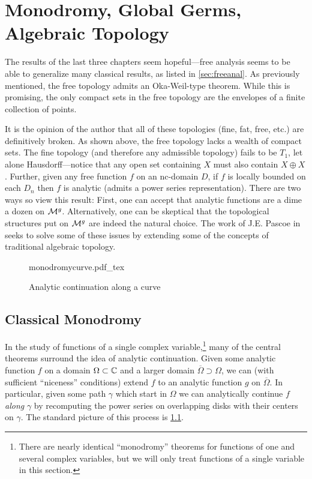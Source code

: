 \chapter{Monodromy, Global Germs, Algebraic Topology}\label{ch:monodromy}

The results of the last three chapters seem hopeful---free analysis seems to be
able to generalize many classical results, as listed in \cref{sec:freeanal}. As
previously mentioned, the free topology admits an Oka-Weil-type theorem.
While this is promising, the only compact sets in the free topology are the
envelopes of a finite collection of points.

It is the opinion of the author that all of these topologies (fine, fat, free,
etc.) are definitively
broken. As shown above, the free topology lacks a wealth of compact sets.
The fine topology (and therefore any admissible topology)
fails to be \(T_1\), let alone Hausdorff---notice that any open set containing
\(X\) must also contain \(X\oplus X\). Further, given any free function \(f\)
on an nc-domain \(D\), if \(f\) is locally bounded on each \(D_n\) then \(f\)
is analytic (admits a power series representation). There are two ways so view
this result: First, one can accept that analytic functions are a dime a dozen on
\(\mathcal{M}^{g} \). Alternatively, one can be skeptical that the topological
structures put on \(\mathcal{M}^{g} \) are indeed the natural choice. The work of J.E.
Pascoe in \cite{pascoeFreeNoncommutativePrincipal2020} seeks to solve some of
these issues by extending some of the concepts of traditional algebraic
topology.
\begin{figure}[h!]%
\centering
  \def\svgwidth{0.8\columnwidth}
  {monodromycurve.pdf_tex}
\caption{Analytic continuation along a curve}
\label{fig:monocurve}
\end{figure}

\newpage

\section{Classical Monodromy}%
\label{sec:classmono}

In the study of functions of a single complex variable,\footnote{There are nearly
  identical ``monodromy'' theorems for functions of one and several complex
  variables, but we will only treat functions of a single variable in this section.}
many of the central
theorems surround the idea of analytic continuation. Given some analytic
function \(f\) on a domain \(\Omega \subset\mathbb{C} \) and a larger domain
\(\overline{\Omega} \supset \Omega\), we can (with sufficient
``niceness'' conditions) extend \(f\) to an analytic function \(g\) on
\(\overline{\Omega}\). In particular, given some path \(\gamma\) which start in
\(\Omega\) we can analytically continue \(f\) \emph{along} \(\gamma\) by recomputing the
power series on overlapping disks with their centers on \(\gamma\). The
standard picture of this process is \cref{fig:monocurve}.

